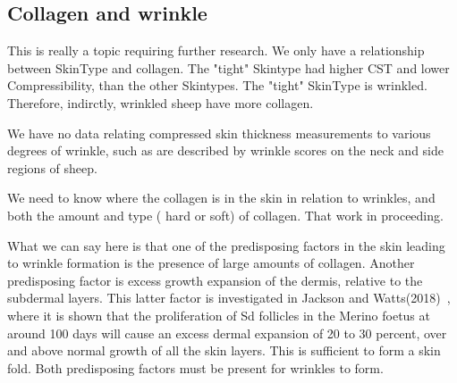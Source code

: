 \documentclass[titlepage]{article}  %
\begin{document}
\subsection{Collagen and wrinkle}
This is really a topic requiring further research. We only have a relationship between SkinType and collagen. The "tight" Skintype had higher CST and lower Compressibility, than the other Skintypes. The "tight" SkinType is wrinkled. Therefore, indirctly, wrinkled sheep have more collagen. 

We have no data relating compressed skin thickness measurements to various degrees of wrinkle, such as are described by wrinkle scores on the neck and side regions of sheep. 

We need to know where the collagen is in the skin in relation to wrinkles, and both the amount and type ( hard or soft) of collagen. That work in proceeding. 

What we can say here is that one of the predisposing factors in the skin leading to wrinkle formation is the presence of large amounts of collagen. Another predisposing factor is excess growth expansion of the dermis, relative to the subdermal layers. This latter factor is investigated in Jackson and Watts(2018)~\cite{jack:18}, where it is shown that the  proliferation of Sd follicles in the Merino foetus at around 100 days  will cause an excess dermal expansion of 20 to 30 percent, over and above normal growth of all the skin layers. This is sufficient to form a skin fold. Both predisposing factors must be present for wrinkles to form.
\end{document}
